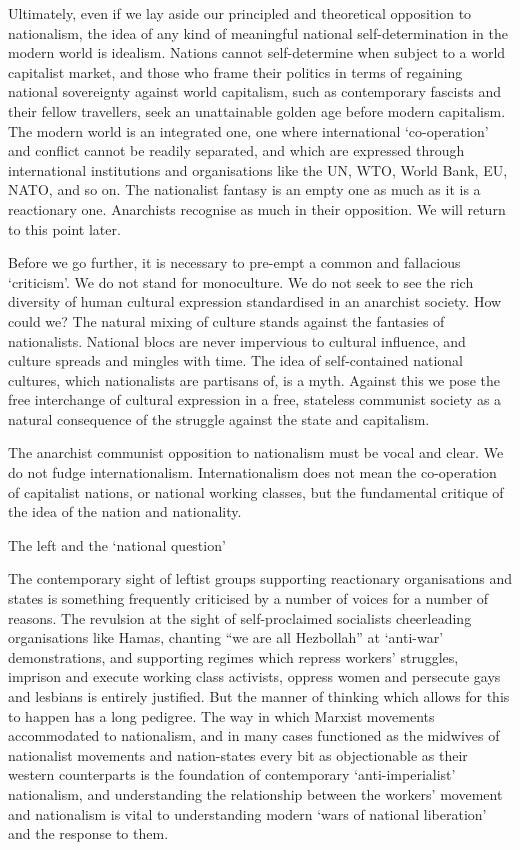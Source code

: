 Ultimately, even if we lay aside our principled and theoretical opposition to nationalism, the idea of any kind of meaningful national self-determination in the modern world is idealism.
Nations cannot self-determine when subject to a world capitalist market, and those who frame their politics in terms of regaining national sovereignty against world capitalism, such as contemporary fascists and their fellow travellers, seek an unattainable golden age before modern capitalism.
The modern world is an integrated one, one where international ‘co-operation’ and conflict cannot be readily separated, and which are expressed through international institutions and organisations like the UN, WTO, World Bank, EU, NATO, and so on.
The nationalist fantasy is an empty one as much as it is a reactionary one.
Anarchists recognise as much in their opposition.
We will return to this point later.

Before we go further, it is necessary to pre-empt a common and fallacious ‘criticism’.
We do not stand for monoculture.
We do not seek to see the rich diversity of human cultural expression standardised in an anarchist society.
How could we? The natural mixing of culture stands against the fantasies of nationalists.
National blocs are never impervious to cultural influence, and culture spreads and mingles with time.
The idea of self-contained national cultures, which nationalists are partisans of, is a myth.
Against this we pose the free interchange of cultural expression in a free, stateless communist society as a natural consequence of the struggle against the state and capitalism.

The anarchist communist opposition to nationalism must be vocal and clear.
We do not fudge internationalism.
Internationalism does not mean the co-operation of capitalist nations, or national working classes, but the fundamental critique of the idea of the nation and nationality.

The left and the ‘national question’

The contemporary sight of leftist groups supporting reactionary organisations and states is something frequently criticised by a number of voices for a number of reasons.
The revulsion at the sight of self-proclaimed socialists cheerleading organisations like Hamas, chanting “we are all Hezbollah” at ‘anti-war’ demonstrations, and supporting regimes which repress workers’ struggles, imprison and execute working class activists, oppress women and persecute gays and lesbians is entirely justified.
But the manner of thinking which allows for this to happen has a long pedigree.
The way in which Marxist movements accommodated to nationalism, and in many cases functioned as the midwives of nationalist movements and nation-states every bit as objectionable as their western counterparts is the foundation of contemporary ‘anti-imperialist’ nationalism, and understanding the relationship between the workers’ movement and nationalism is vital to understanding modern ‘wars of national liberation’ and the response to them.

